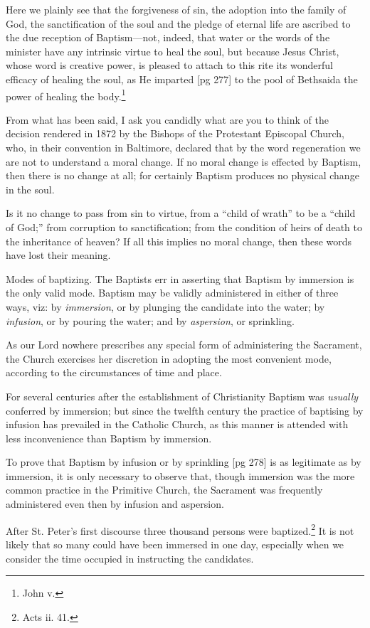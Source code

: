 Here we plainly see that the forgiveness of sin,
the adoption into the family of God, the sanctification
of the soul and the pledge of eternal life
are ascribed to the due reception of Baptism—not,
indeed, that water or the words of the minister
have any intrinsic virtue to heal the soul, but
because Jesus Christ, whose word is creative
power, is pleased to attach to this rite its wonderful
efficacy of healing the soul, as He imparted
[pg 277]
to the pool of Bethsaida the power of healing the
body.\footnote{John v.}

From what has been said, I ask you candidly
what are you to think of the decision rendered in
1872 by the Bishops of the Protestant Episcopal
Church, who, in their convention in Baltimore, declared
that by the word regeneration we are not to
understand a moral change. If no moral change
is effected by Baptism, then there is no change at
all; for certainly Baptism produces no physical
change in the soul.

Is it no change to pass from sin to virtue, from
a “child of wrath” to be a “child of God;” from
corruption to sanctification; from the condition of
heirs of death to the inheritance of heaven? If all
this implies no moral change, then these words
have lost their meaning.

Modes of baptizing. The Baptists err in asserting
that Baptism by immersion is the only valid
mode. Baptism may be validly administered in
either of three ways, viz: by \emph{immersion}, or by
plunging the candidate into the water; by \emph{infusion},
or by pouring the water; and by \emph{aspersion}, or
sprinkling.

As our Lord nowhere prescribes any special
form of administering the Sacrament, the Church
exercises her discretion in adopting the most convenient
mode, according to the circumstances of
time and place.

For several centuries after the establishment of
Christianity Baptism was \emph{usually} conferred by
immersion; but since the twelfth century the practice
of baptising by infusion has prevailed in the
Catholic Church, as this manner is attended with
less inconvenience than Baptism by immersion.

To prove that Baptism by infusion or by sprinkling
[pg 278]
is as legitimate as by immersion, it is only
necessary to observe that, though immersion was
the more common practice in the Primitive
Church, the Sacrament was frequently administered
even then by infusion and aspersion.

After St. Peter's first discourse three thousand
persons were baptized.\footnote{Acts
ii. 41.} It is not likely that so
many could have been immersed in one day,
especially when we consider the time occupied in
instructing the candidates.

